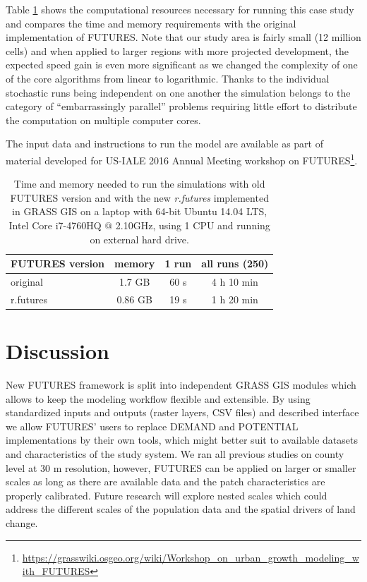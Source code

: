 \documentclass{isprs}
\begin{document}
Table \ref{tab:benchmark} shows the computational resources
necessary for running this case study and compares 
the time and memory requirements with the original
implementation of FUTURES. Note that
our study area is fairly small (12 million cells)
and when applied to larger regions with more projected development, 
the expected speed gain is even more significant
as we changed the complexity of one of the core algorithms from linear to logarithmic.
Thanks to the individual stochastic runs being independent on one another
the simulation belongs to the category of 
``embarrassingly parallel''  problems \cite{herlihy2012art}
requiring little effort to distribute the computation on multiple computer cores.

The input data and instructions to run the model are available as part of material
developed for US-IALE 2016 Annual Meeting workshop on FUTURES\footnote{\url{https://grasswiki.osgeo.org/wiki/Workshop_on_urban_growth_modeling_with_FUTURES}}.

\begin{table}[htp]
 \centering
\begin{center}
\begin{tabular}{lccc}
\toprule
FUTURES version & memory & 1 run & all runs (250)\\ \midrule
original & 1.7 GB & 60 s & 4 h 10 min\\
r.futures  & 0.86 GB & 19 s & 1 h 20 min\\
\bottomrule
\end{tabular}
\end{center}
 \caption{Time and memory needed to run the simulations
 with old FUTURES version and with the new \emph{r.futures}
 implemented in GRASS GIS on a laptop with 64-bit Ubuntu 14.04 LTS,
 Intel Core i7-4760HQ $@$ 2.10GHz, using 1 CPU and running on external hard drive.}
 \label{tab:benchmark}
\end{table}


\section{Discussion}
New FUTURES framework is split into independent GRASS GIS modules
which allows to keep the modeling workflow flexible and extensible.
By using standardized inputs and outputs (raster layers, CSV files)
and described interface
we allow FUTURES' users to replace DEMAND and POTENTIAL implementations
by their own tools, which might better suit to available datasets and characteristics of the study system.
We ran all previous studies on county level at 30 m resolution,
however, FUTURES can be applied on larger or smaller scales
as long as there are available data and the patch characteristics are properly calibrated.
Future research will explore nested scales which could address the different scales of the population data
and the spatial drivers of land change.
\end{document}
